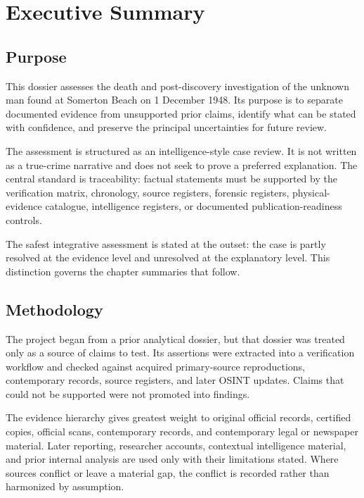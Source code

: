\chapter{Executive Summary}
\label{chap:executive-summary}


\section{Purpose}

This dossier assesses the death and post-discovery investigation of the unknown man found at Somerton Beach on 1 December 1948. Its purpose is to separate documented evidence from unsupported prior claims, identify what can be stated with confidence, and preserve the principal uncertainties for future review.

The assessment is structured as an intelligence-style case review. It is not written as a true-crime narrative and does not seek to prove a preferred explanation. The central standard is traceability: factual statements must be supported by the verification matrix, chronology, source registers, forensic registers, physical-evidence catalogue, intelligence registers, or documented publication-readiness controls.

The safest integrative assessment is stated at the outset: the case is partly resolved at the evidence level and unresolved at the explanatory level. This distinction governs the chapter summaries that follow.

\section{Methodology}

The project began from a prior analytical dossier, but that dossier was treated only as a source of claims to test. Its assertions were extracted into a verification workflow and checked against acquired primary-source reproductions, contemporary records, source registers, and later OSINT updates. Claims that could not be supported were not promoted into findings.

The evidence hierarchy gives greatest weight to original official records, certified copies, official scans, contemporary records, and contemporary legal or newspaper material. Later reporting, researcher accounts, contextual intelligence material, and prior internal analysis are used only with their limitations stated. Where sources conflict or leave a material gap, the conflict is recorded rather than harmonized by assumption.

